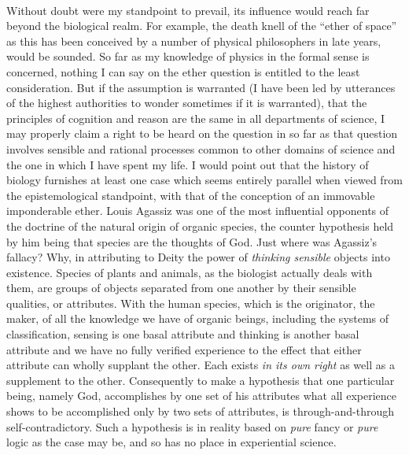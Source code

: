 \documentclass[a4paper, 11pt, oneside, polutonikogreek, english, landscape]{article}
\begin{document}
\paragraph{}
Without doubt were my standpoint to prevail, its influence would reach far beyond the biological realm. For example, the death knell of the ``ether of space'' as this has been conceived by a number of physical philosophers in late years, would be sounded. So far as my knowledge of physics in the formal sense is concerned, nothing I can say on the ether question is entitled to the least consideration. But if the assumption is warranted (I have been led by utterances of the highest authorities to wonder sometimes if it is warranted), that the principles of cognition and reason are the same in all departments of science, I may properly claim a right to be heard on the question in so far as that question involves sensible and rational processes common to other domains of science and the one in which I have spent my life. I would point out that the history of biology furnishes at least one case which seems entirely parallel when viewed from the epistemological standpoint, with that of the conception of an immovable imponderable ether. Louis Agassiz was one of the most influential opponents of the doctrine of the natural origin of organic species, the counter hypothesis held by him being that species are the thoughts of God. Just where was Agassiz's fallacy? Why, in attributing to Deity the power of \emph{thinking sensible} objects into existence. Species of plants and animals, as the biologist actually deals with them, are groups of objects separated from one another by their sensible qualities, or attributes. With the human species, which is the originator, the maker, of all the knowledge we have of organic beings, including the systems of classification, sensing is one basal attribute and thinking is another basal attribute and we have no fully verified experience to the effect that either attribute can wholly supplant the other. Each exists \emph{in its own right} as well as a supplement to the other. Consequently to make a hypothesis that one particular being, namely God, accomplishes by one set of his attributes what all experience shows to be accomplished only by two sets of attributes, is through-and-through self-contradictory. Such a hypothesis is in reality based on \emph{pure} fancy or \emph{pure} logic as the case may be, and so has no place in experiential science.
\end{document}
